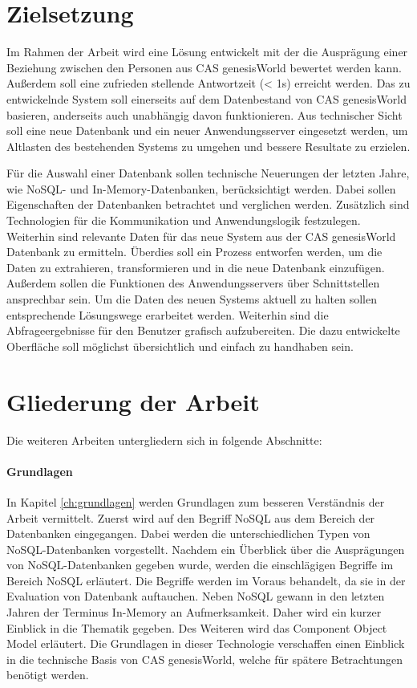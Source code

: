 \section{Zielsetzung}
\label{ch:Einfuehrung:sec:Zielsetzung}

Im Rahmen der Arbeit wird eine Lösung entwickelt mit der die Ausprägung einer Beziehung zwischen den Personen aus CAS genesisWorld bewertet werden kann. Außerdem soll eine zufrieden stellende Antwortzeit (< 1s) erreicht werden. Das zu entwickelnde System soll einerseits auf dem Datenbestand von CAS genesisWorld basieren, anderseits auch unabhängig davon funktionieren. Aus technischer Sicht soll eine neue Datenbank und ein neuer Anwendungsserver eingesetzt werden, um Altlasten des bestehenden Systems zu umgehen und bessere Resultate zu erzielen. 

Für die Auswahl einer Datenbank sollen technische Neuerungen der letzten Jahre, wie NoSQL- und In-Memory-Datenbanken, berücksichtigt werden. Dabei sollen Eigenschaften der Datenbanken betrachtet und verglichen werden. Zusätzlich sind Technologien für die Kommunikation und Anwendungslogik festzulegen. Weiterhin sind relevante Daten für das neue System aus der CAS genesisWorld Datenbank zu ermitteln. Überdies soll ein Prozess entworfen werden, um die Daten zu extrahieren, transformieren und in die neue Datenbank einzufügen. Außerdem sollen die Funktionen des Anwendungsservers über Schnittstellen ansprechbar sein. Um die Daten des neuen Systems aktuell zu halten sollen entsprechende Lösungswege erarbeitet werden. Weiterhin sind die Abfrageergebnisse für den Benutzer grafisch aufzubereiten. Die dazu entwickelte Oberfläche soll möglichst übersichtlich und einfach zu handhaben sein.

\section{Gliederung der Arbeit}
\label{ch:Einfuehrung:sec:Gliederung}

Die weiteren Arbeiten untergliedern sich in folgende Abschnitte: 
 
\paragraph{Grundlagen} In Kapitel \ref{ch:grundlagen} werden Grundlagen zum besseren Verständnis der Arbeit vermittelt. Zuerst wird auf den Begriff NoSQL aus dem Bereich der Datenbanken eingegangen. Dabei werden die unterschiedlichen Typen von NoSQL-Datenbanken vorgestellt. Nachdem ein Überblick über die Ausprägungen von NoSQL-Datenbanken gegeben wurde, werden die einschlägigen Begriffe im Bereich NoSQL erläutert. Die Begriffe werden im Voraus behandelt, da sie in der Evaluation von Datenbank auftauchen. Neben NoSQL gewann in den letzten Jahren der Terminus In-Memory an Aufmerksamkeit. Daher wird ein kurzer Einblick in die Thematik gegeben. Des Weiteren wird das Component Object Model erläutert. Die Grundlagen in dieser Technologie verschaffen einen Einblick in die technische Basis von CAS genesisWorld, welche für spätere Betrachtungen benötigt werden. 

